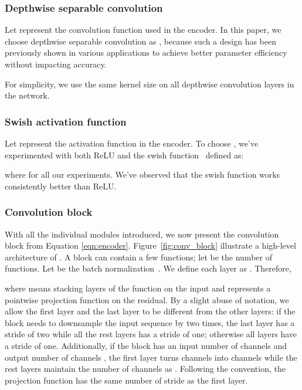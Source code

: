 \documentclass[a4paper]{article}
\begin{document}
\vspace{-0.05in}
\subsubsection{Depthwise separable convolution}
\vspace{-0.02in}
Let  represent the convolution function used in the encoder.
In this paper, we choose depthwise separable convolution as , because such a design has been previously shown in various applications \cite{chollet2017xception,kriman2019quartznet,sandler2018mobilenetv2} to achieve better parameter efficiency without impacting accuracy.

For simplicity, we use the same kernel size on all depthwise convolution layers in the network.

\vspace{-0.05in}
\subsubsection{Swish activation function}
\vspace{-0.05in}
Let  represent the activation function in the encoder. To choose , we've experimented with both ReLU and the swish function~\cite{ramachandran2017searching} defined as:
\begin{small}

\end{small}
where  for all our experiments. We've observed that the swish function works consistently better than ReLU.  
\vspace{-0.05in}
\subsubsection{Convolution block}
\vspace{-0.02in}
With all the individual modules introduced, we now present the convolution block  from Equation \eqref{eqn:encoder}. Figure~\ref{fig:conv_block} illustrate a high-level architecture of . A block  can contain a few  functions; let  be the number of  functions. Let  be the batch normalization~\cite{ioffe2015batch}. We define each layer as . Therefore, 

\begin{small}

\end{small} where  means stacking  layers of the function  on the input and  represents a pointwise projection function on the residual. By a slight abuse of notation, we allow the first layer and the last layer to be different from the other  layers: if the block needs to downsample the input sequence by two times, the last layer has a stride of two while all the rest  layers has a stride of one; otherwise all  layers have a stride of one. Additionally, if the block has an input number of channels  and output number of channels , the first layer  turns  channels into  channels while the rest  layers maintain the number of channels as . Following the convention, the projection function  has the same number of stride as the first layer.
\end{document}
